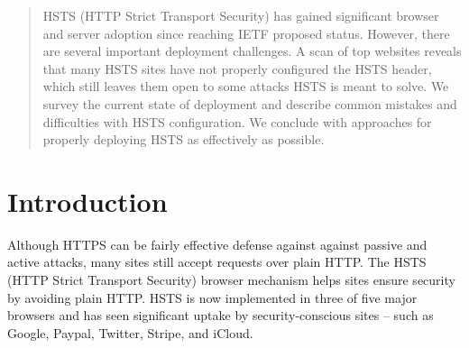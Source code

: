 \documentclass{acm_proc_article-sp}
\begin{document}
\date{October 08, 2013}

\maketitle
\begin{abstract}
HSTS (HTTP Strict Transport Security) has gained significant browser and server adoption since reaching IETF proposed status. However, there are several important deployment challenges. A scan of top websites reveals that many HSTS sites have not properly configured the HSTS header, which still leaves them open to some attacks HSTS is meant to solve. We survey the current state of deployment and describe common mistakes and difficulties with HSTS configuration. We conclude with approaches for properly deploying HSTS as effectively as possible.\end{abstract}





\section{Introduction}
\label{sec:intro}

Although HTTPS can be fairly effective defense against against passive and active attacks, many sites still accept requests over plain HTTP. The HSTS (HTTP Strict Transport Security) browser mechanism helps sites ensure security by avoiding plain HTTP. HSTS is now implemented in three of five major browsers and has seen significant uptake by security-conscious sites -- such as Google, Paypal, Twitter, Stripe, and iCloud.
\end{document}
